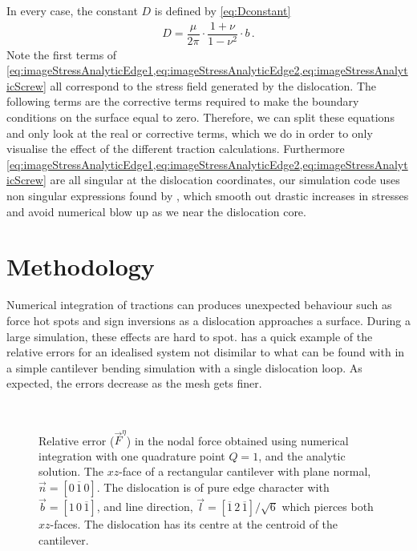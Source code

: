 \documentclass[11pt]{iopart}
\begin{document}
In every case, the constant $D$ is defined by \cref{eq:Dconstant}
\begin{align}\label{eq:Dconstant}
    D = \dfrac{\mu}{2\pi} \cdot \dfrac{1+\nu}{1-\nu^2} \cdot b\,.
\end{align}
Note the first terms of \cref{eq:imageStressAnalyticEdge1,eq:imageStressAnalyticEdge2,eq:imageStressAnalyticScrew} all correspond to the stress field generated by the dislocation. The following terms are the corrective terms required to make the boundary conditions on the surface equal to zero. Therefore, we can split these equations and only look at the real or corrective terms, which we do in order to only visualise the effect of the different traction calculations. Furthermore \cref{eq:imageStressAnalyticEdge1,eq:imageStressAnalyticEdge2,eq:imageStressAnalyticScrew} are all singular at the dislocation coordinates, our simulation code uses non singular expressions found by \citet{Cai2006}, which smooth out drastic increases in stresses and avoid numerical blow up as we near the dislocation core.

\section{Methodology}\label{s:method}
Numerical integration of tractions can produces unexpected behaviour such as force hot spots and sign inversions as a dislocation approaches a surface. During a large simulation, these effects are hard to spot.  has a quick example of the relative errors for an idealised system not disimilar to what can be found with in a simple cantilever bending simulation with a single dislocation loop. As expected, the errors decrease as the mesh gets finer.
\begin{figure}
    \centering
    ~
    \caption{Relative error ($\vec{F}^{\eta}$) in the nodal force obtained using numerical integration with one quadrature point $Q = 1$, and the analytic solution. The $xz$-face of a rectangular cantilever with plane normal, $\vec{n} = \left[0\,\overline{1}\,0\right]$. The dislocation is of pure edge character with $\vec{b} = [1\,0\,\overline{1}]$, and line direction, $\vec{l} = \left[\overline{1}\,2\,\overline{1}\right]/\sqrt{6}$ which pierces both $xz$-faces. The dislocation has its centre at the centroid of the cantilever.}
    \label{f:err_basic_cantilever}
\end{figure}
\end{document}
